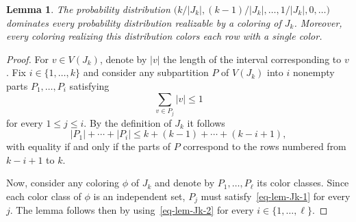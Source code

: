 \documentclass[10pt,a4paper]{article}
\newtheorem{lemma}{Lemma}
\begin{document}
\begin{lemma}
\label{lem-Jk}
The probability distribution $\big(k/|J_{k}|, (k-1)/|J_{k}|, \dots, 1/|J_{k}|, 0, \dots\big)$
dominates every probability distribution realizable by a coloring 
of $J_{k}$. Moreover, every coloring 
realizing this distribution colors each row with a single color.
\end{lemma}
\begin{proof}
For $v\in V(J_{k})$, denote by $|v|$ the length of the interval corresponding
to $v$. Fix $i\in\{1,\dots,k\}$ and consider any subpartition $P$ of 
$V(J_{k})$ into $i$ nonempty parts $P_{1}, \dots, P_{i}$ satisfying
\begin{equation}
\label{eq-lem-Jk-1}
\sum_{v\in P_{j}} |v| \leq 1
\end{equation}
for every $1\leq j\leq i$. By the definition of $J_{k}$ it follows 
\begin{equation}
\label{eq-lem-Jk-2}
|P_{1}| + \cdots + |P_{i}| \leq k + (k-1) + \cdots + (k-i+1),
\end{equation}
with equality if and only if the parts of $P$ correspond to
the rows numbered from $k-i+1$ to $k$.

Now, consider any coloring $\phi$ of $J_{k}$ and denote
by $P_{1}, \dots, P_{\ell}$ its color classes.
Since each color class of $\phi$ is an independent set, $P_{j}$ must 
satisfy~\eqref{eq-lem-Jk-1} for every $j$. The lemma follows then
by using~\eqref{eq-lem-Jk-2} for every $i\in \{1,\dots, \ell\}$.
\end{proof}
\end{document}
